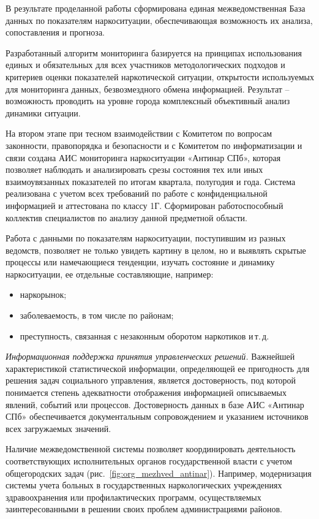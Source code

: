 В результате проделанной работы сформирована единая межведомственная База данных
по показателям наркоситуации, обеспечивающая возможность их анализа,
сопоставления и прогноза. 

Разработанный алгоритм мониторинга базируется на принципах использования единых
и обязательных для всех участников методологических подходов и критериев оценки
показателей наркотической ситуации, открытости используемых для мониторинга
данных, безвозмездного обмена информацией. Результат – возможность проводить на
уровне города комплексный объективный анализ динамики ситуации.

На втором этапе при тесном взаимодействии с Комитетом по вопросам законности,
правопорядка и безопасности и с Комитетом по информатизации и связи создана АИС
мониторинга наркоситуации «Антинар СПб», которая позволяет наблюдать и
анализировать срезы состояния тех или иных взаимоувязанных показателей по итогам
квартала, полугодия и года. Система реализована с учетом всех требований по
работе с конфиденциальной информацией и аттестована по классу 1Г. Сформирован
работоспособный коллектив специалистов по анализу данной предметной области.

Работа с данными по показателям наркоситуации, поступившим из разных ведомств,
позволяет не только увидеть картину в целом, но и выявлять скрытые процессы или
намечающиеся тенденции, изучать состояние и динамику наркоситуации, ее отдельные
составляющие, например:
\begin{itemize}
\item наркорынок; 
\item заболеваемость, в том числе по районам;
\item преступность, связанная с незаконным оборотом наркотиков и\,т.\,д.
\end{itemize}

\textit{Информационная поддержка принятия управленческих решений.}
Важнейшей характеристикой статистической информации, определяющей ее пригодность
для решения задач социального управления, является достоверность, под которой
понимается степень адекватности отображения информацией описываемых явлений,
событий или процессов. Достоверность данных в базе АИС «Антинар СПб»
обеспечивается документальным сопровождением и указанием источников всех
загружаемых значений.

Наличие межведомственной системы позволяет координировать деятельность
соответствующих исполнительных органов государственной власти с учетом
общегородских задач (рис.~\ref{fig:org_mezhved_antinar}). Например,
модернизация системы учета больных в государственных наркологических учреждениях
здравоохранения или профилактических программ, осуществляемых заинтересованными
в решении своих проблем администрациями  районов.

